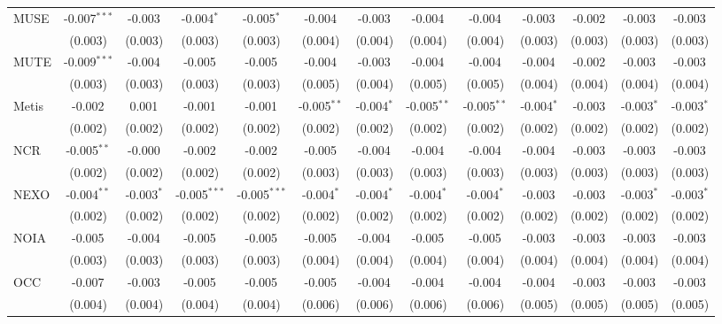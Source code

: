 \begin{table}[!htbp]
\begin{tabular}{@{\extracolsep{5pt}}lcccccccccccc}
 MUSE & -0.007$^{***}$ & -0.003$^{}$ & -0.004$^{*}$ & -0.005$^{*}$ & -0.004$^{}$ & -0.003$^{}$ & -0.004$^{}$ & -0.004$^{}$ & -0.003$^{}$ & -0.002$^{}$ & -0.003$^{}$ & -0.003$^{}$ \\
  & (0.003) & (0.003) & (0.003) & (0.003) & (0.004) & (0.004) & (0.004) & (0.004) & (0.003) & (0.003) & (0.003) & (0.003) \\
 MUTE & -0.009$^{***}$ & -0.004$^{}$ & -0.005$^{}$ & -0.005$^{}$ & -0.004$^{}$ & -0.003$^{}$ & -0.004$^{}$ & -0.004$^{}$ & -0.004$^{}$ & -0.002$^{}$ & -0.003$^{}$ & -0.003$^{}$ \\
  & (0.003) & (0.003) & (0.003) & (0.003) & (0.005) & (0.004) & (0.005) & (0.005) & (0.004) & (0.004) & (0.004) & (0.004) \\
 Metis & -0.002$^{}$ & 0.001$^{}$ & -0.001$^{}$ & -0.001$^{}$ & -0.005$^{**}$ & -0.004$^{*}$ & -0.005$^{**}$ & -0.005$^{**}$ & -0.004$^{*}$ & -0.003$^{}$ & -0.003$^{*}$ & -0.003$^{*}$ \\
  & (0.002) & (0.002) & (0.002) & (0.002) & (0.002) & (0.002) & (0.002) & (0.002) & (0.002) & (0.002) & (0.002) & (0.002) \\
 NCR & -0.005$^{**}$ & -0.000$^{}$ & -0.002$^{}$ & -0.002$^{}$ & -0.005$^{}$ & -0.004$^{}$ & -0.004$^{}$ & -0.004$^{}$ & -0.004$^{}$ & -0.003$^{}$ & -0.003$^{}$ & -0.003$^{}$ \\
  & (0.002) & (0.002) & (0.002) & (0.002) & (0.003) & (0.003) & (0.003) & (0.003) & (0.003) & (0.003) & (0.003) & (0.003) \\
 NEXO & -0.004$^{**}$ & -0.003$^{*}$ & -0.005$^{***}$ & -0.005$^{***}$ & -0.004$^{*}$ & -0.004$^{*}$ & -0.004$^{*}$ & -0.004$^{*}$ & -0.003$^{}$ & -0.003$^{}$ & -0.003$^{*}$ & -0.003$^{*}$ \\
  & (0.002) & (0.002) & (0.002) & (0.002) & (0.002) & (0.002) & (0.002) & (0.002) & (0.002) & (0.002) & (0.002) & (0.002) \\
 NOIA & -0.005$^{}$ & -0.004$^{}$ & -0.005$^{}$ & -0.005$^{}$ & -0.005$^{}$ & -0.004$^{}$ & -0.005$^{}$ & -0.005$^{}$ & -0.003$^{}$ & -0.003$^{}$ & -0.003$^{}$ & -0.003$^{}$ \\
  & (0.003) & (0.003) & (0.003) & (0.003) & (0.004) & (0.004) & (0.004) & (0.004) & (0.004) & (0.004) & (0.004) & (0.004) \\
 OCC & -0.007$^{}$ & -0.003$^{}$ & -0.005$^{}$ & -0.005$^{}$ & -0.005$^{}$ & -0.004$^{}$ & -0.004$^{}$ & -0.004$^{}$ & -0.004$^{}$ & -0.003$^{}$ & -0.003$^{}$ & -0.003$^{}$ \\
  & (0.004) & (0.004) & (0.004) & (0.004) & (0.006) & (0.006) & (0.006) & (0.006) & (0.005) & (0.005) & (0.005) & (0.005) \\

\end{tabular}
\end{table}
